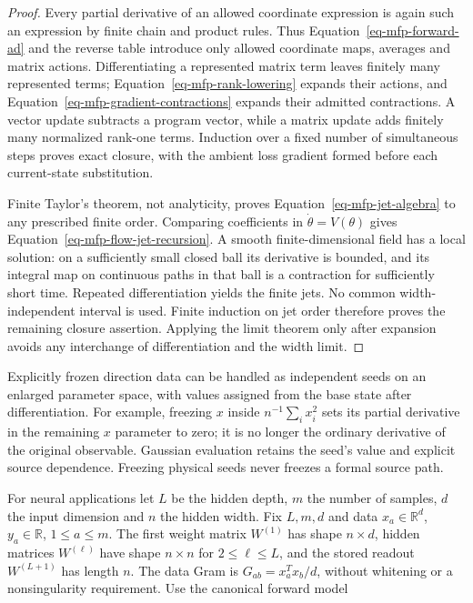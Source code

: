 \documentclass[
  11pt,
]{article}
\theoremstyle{definition}
\theoremstyle{plain}
\theoremstyle{plain}
\theoremstyle{plain}
\theoremstyle{remark}
\begin{document}
\begin{proof}
Every partial derivative of an allowed coordinate expression is again
such an expression by finite chain and product rules. Thus
Equation~\ref{eq-mfp-forward-ad} and the reverse table introduce only
allowed coordinate maps, averages and matrix actions. Differentiating a
represented matrix term leaves finitely many represented terms;
Equation~\ref{eq-mfp-rank-lowering} expands their actions, and
Equation~\ref{eq-mfp-gradient-contractions} expands their admitted
contractions. A vector update subtracts a program vector, while a matrix
update adds finitely many normalized rank-one terms. Induction over a
fixed number of simultaneous steps proves exact closure, with the
ambient loss gradient formed before each current-state substitution.

Finite Taylor's theorem, not analyticity, proves
Equation~\ref{eq-mfp-jet-algebra} to any prescribed finite order.
Comparing coefficients in \(\dot\theta=V(\theta)\) gives
Equation~\ref{eq-mfp-flow-jet-recursion}. A smooth finite-dimensional
field has a local solution: on a sufficiently small closed ball its
derivative is bounded, and its integral map on continuous paths in that
ball is a contraction for sufficiently short time. Repeated
differentiation yields the finite jets. No common width-independent
interval is used. Finite induction on jet order therefore proves the
remaining closure assertion. Applying the limit theorem only after
expansion avoids any interchange of differentiation and the width limit.
\end{proof}

Explicitly frozen direction data can be handled as independent seeds on
an enlarged parameter space, with values assigned from the base state
after differentiation. For example, freezing \(x\) inside
\(n^{-1}\sum_i x_i^2\) sets its partial derivative in the remaining
\(x\) parameter to zero; it is no longer the ordinary derivative of the
original observable. Gaussian evaluation retains the seed's value and
explicit source dependence. Freezing physical seeds never freezes a
formal source path.

For neural applications let \(L\) be the hidden depth, \(m\) the number
of samples, \(d\) the input dimension and \(n\) the hidden width. Fix
\(L,m,d\) and data \(x_a\in\mathbb R^d\), \(y_a\in\mathbb R\),
\(1\le a\le m\). The first weight matrix \(W^{(1)}\) has shape
\(n\times d\), hidden matrices \(W^{(\ell)}\) have shape \(n\times n\)
for \(2\le\ell\le L\), and the stored readout \(W^{(L+1)}\) has length
\(n\). The data Gram is \(G_{ab}=x_a^Tx_b/d\), without whitening or a
nonsingularity requirement. Use the canonical forward model
\end{document}

